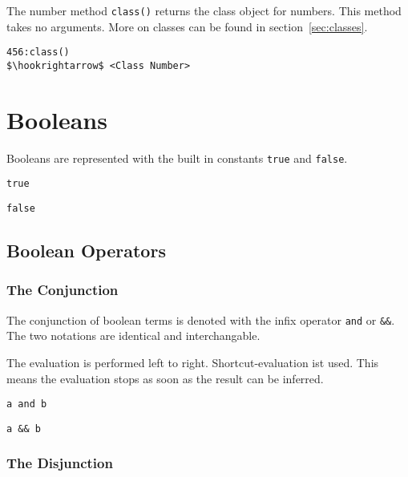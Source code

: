 \documentclass[11pt,a4paper]{scrbook}
\begin{document}
The number method \texttt{class()} returns the class object for numbers. This
method takes no arguments. More on classes can be found in
section~\ref{sec:classes}.

\begin{lstlisting}[language=BibTool,mathescape=true]
456:class()
$\hookrightarrow$ <Class Number>
\end{lstlisting}


\section{Booleans}

Booleans are represented with the built in constants \verb|true| and
\verb|false|.

\begin{lstlisting}[language=BibTool]
true
\end{lstlisting}

\begin{lstlisting}[language=BibTool]
false
\end{lstlisting}


\subsection{Boolean Operators}

\subsubsection{The Conjunction}

The conjunction of boolean terms is denoted with the infix operator \verb|and|
or \verb|&&|. The two notations are identical and interchangable.

The evaluation is performed left to right. Shortcut-evaluation ist used. This
means the evaluation stops as soon as the result can be inferred.

\begin{lstlisting}[language=BibTool]
a and b
\end{lstlisting}

\begin{lstlisting}[language=BibTool]
a && b
\end{lstlisting}


\subsubsection{The Disjunction}
\end{document}
